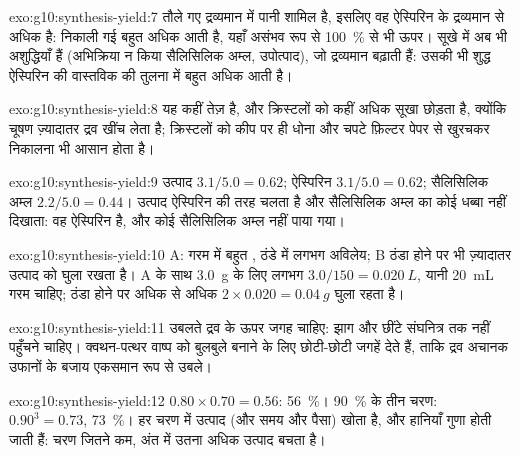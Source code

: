 \begin{solution}{exo:g10:synthesis-yield:7}
तौले गए द्रव्यमान में पानी शामिल है, इसलिए वह ऐस्पिरिन के द्रव्यमान से अधिक है:
निकाली गई  बहुत अधिक आती है, यहाँ असंभव रूप से
\qty{100}{\percent} से भी ऊपर। सूखे  में अब भी अशुद्धियाँ हैं
(अभिक्रिया न किया सैलिसिलिक अम्ल, उपोत्पाद), जो द्रव्यमान बढ़ाती हैं: उसकी  भी
शुद्ध ऐस्पिरिन की वास्तविक  की तुलना में बहुत अधिक आती है।
\end{solution}

\begin{solution}{exo:g10:synthesis-yield:8}
यह कहीं तेज़ है, और क्रिस्टलों को कहीं अधिक सूखा छोड़ता है, क्योंकि
चूषण ज़्यादातर द्रव खींच लेता है; क्रिस्टलों को कीप पर ही धोना और चपटे
फ़िल्टर पेपर से खुरचकर निकालना भी आसान होता है।
\end{solution}

\begin{solution}{exo:g10:synthesis-yield:9}
उत्पाद $3.1/5.0 = 0.62$; ऐस्पिरिन $3.1/5.0 = 0.62$; सैलिसिलिक अम्ल
$2.2/5.0 = 0.44$। उत्पाद ऐस्पिरिन की तरह चलता है और सैलिसिलिक अम्ल का कोई धब्बा
नहीं दिखाता: वह ऐस्पिरिन है, और कोई सैलिसिलिक अम्ल नहीं पाया गया।
\end{solution}

\begin{solution}{exo:g10:synthesis-yield:10}
 A: गरम में बहुत , ठंडे में लगभग अविलेय;  B ठंडा होने पर भी
ज़्यादातर उत्पाद को घुला रखता है। A के साथ \qty{3.0}{g} के लिए लगभग
$3.0 / 150 = \qty{0.020}{L}$, यानी \qty{20}{mL} गरम  चाहिए; ठंडा
होने पर अधिक से अधिक $2 \times 0.020 = \qty{0.04}{g}$ घुला रहता है।
\end{solution}

\begin{solution}{exo:g10:synthesis-yield:11}
उबलते द्रव के ऊपर जगह चाहिए: झाग और छींटे संघनित्र तक नहीं पहुँचने
चाहिए। क्वथन-पत्थर वाष्प को बुलबुले बनाने के लिए छोटी-छोटी जगहें देते हैं,
ताकि द्रव अचानक उफानों के बजाय एकसमान रूप से उबले।
\end{solution}

\begin{solution}{exo:g10:synthesis-yield:12}
$0.80 \times 0.70 = 0.56$: \qty{56}{\percent}। \qty{90}{\percent} के तीन
चरण: $0.90^3 = 0.73$, \qty{73}{\percent}। हर चरण में उत्पाद (और समय और पैसा)
खोता है, और हानियाँ गुणा होती जाती हैं: चरण जितने कम, अंत में उतना अधिक
उत्पाद बचता है।
\end{solution}

